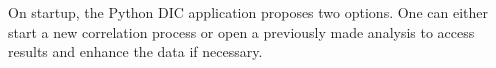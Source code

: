 \indent\indent On startup, the Python DIC application proposes two options. One can either start a new correlation process or open a previously made analysis to access results and enhance the data if necessary.
